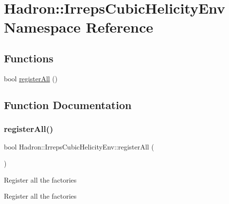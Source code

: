 \hypertarget{namespaceHadron_1_1IrrepsCubicHelicityEnv}{}\section{Hadron\+:\+:Irreps\+Cubic\+Helicity\+Env Namespace Reference}
\label{namespaceHadron_1_1IrrepsCubicHelicityEnv}
\subsection*{Functions}
\begin{DoxyCompactItemize}
\item 
bool \mbox{\hyperlink{namespaceHadron_1_1IrrepsCubicHelicityEnv_a3c43156ee3e7bda6a9a9536083bfdeff}{register\+All}} ()
\end{DoxyCompactItemize}


\subsection{Function Documentation}
\mbox{\label{namespaceHadron_1_1IrrepsCubicHelicityEnv_a3c43156ee3e7bda6a9a9536083bfdeff}} 
\subsubsection{\texorpdfstring{registerAll()}{registerAll()}}
{\footnotesize\ttfamily bool Hadron\+::\+Irreps\+Cubic\+Helicity\+Env\+::register\+All (\begin{DoxyParamCaption}{ }\end{DoxyParamCaption})}

Register all the factories

Register all the factories

